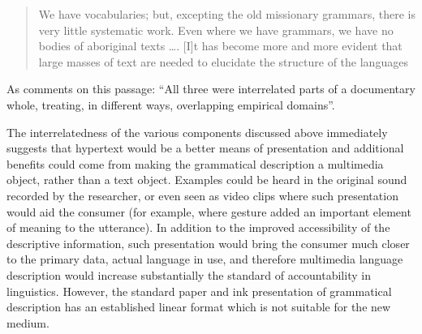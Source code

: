 \begin{quote}
  We have vocabularies; but, excepting the old missionary grammars, there is very little systematic work. Even where we have grammars, we have no bodies of aboriginal texts {\dots}. [I]t has become more and more evident that large masses of text are needed to elucidate the structure of the languages \citep[1]{Boas1917}
\end{quote}

As \citet[163]{Woodbury2011} comments on this passage: ``All three were interrelated parts of a documentary whole, treating, in different ways, overlapping empirical domains''.

The interrelatedness of the various components discussed above immediately suggests that hypertext would be a better means of presentation and additional benefits could come from making the grammatical description a multimedia object, rather than a text object. Examples could be heard in the original sound recorded by the researcher, or even seen as video clips where such presentation would aid the consumer (for example, where gesture added an important element of meaning to the utterance). In addition to the improved accessibility of the descriptive information, such presentation would bring the consumer much closer to the primary data, actual language in use, and therefore multimedia language description would increase substantially the standard of accountability in linguistics. However, the standard paper and ink presentation of grammatical description has an established linear format which is not suitable for the new medium. 

